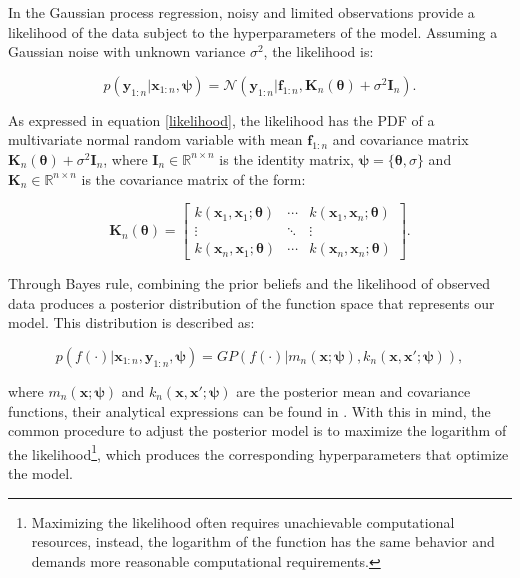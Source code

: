 \documentclass{article}
\begin{document}
In the Gaussian process regression, noisy and limited observations provide a likelihood of the data subject to the hyperparameters of the model. Assuming a Gaussian noise with unknown variance $\sigma^2$, the likelihood is\cite{Pandita2016}:

\begin{equation}
    p(\textbf{y}_{1:n}|\textbf{x}_{1:n}, \boldsymbol{\psi}) = \mathcal{N}(\textbf{y}_{1:n}|\textbf{f}_{1:n},\textbf{K}_n(\boldsymbol{\theta}) + \sigma^2\textbf{I}_n).
    \label{likelihood}
\end{equation}

As expressed in equation \ref{likelihood}, the likelihood has the PDF of a multivariate normal random variable with mean $\textbf{f}_{1:n}$ and covariance matrix $\textbf{K}_n(\boldsymbol{\theta}) + \sigma^2\textbf{I}_n$, where $\textbf{I}_n \in \mathbb{R}^{n\times n}$ is the identity matrix, $\boldsymbol{\psi} = \{ \boldsymbol{\theta}, \sigma \} $ and $\textbf{K}_n \in \mathbb{R}^{n\times n}$ is the covariance matrix of the form:

\begin{equation}
    \textbf{K}_n(\boldsymbol{\theta}) =
    \begin{bmatrix}
        k(\textbf{x}_1,\textbf{x}_1;\boldsymbol{\theta}) & \cdots & k(\textbf{x}_1,\textbf{x}_n;\boldsymbol{\theta}) \\
        \vdots & \ddots & \vdots\\
        k(\textbf{x}_n,\textbf{x}_1;\boldsymbol{\theta}) & \cdots & k(\textbf{x}_n,\textbf{x}_n;\boldsymbol{\theta})
    \end{bmatrix}.
\end{equation}

Through Bayes rule, combining the prior beliefs and the likelihood of observed data produces a posterior distribution of the function space that represents our model. This distribution is described as\cite{Pandita2016}:

\begin{equation}
    p(f(\cdot)|\textbf{x}_{1:n},\textbf{y}_{1:n},\boldsymbol{\psi}) = GP(f(\cdot)|m_n(\textbf{x};\boldsymbol{\psi}),k_n(\textbf{x},\textbf{x}';\boldsymbol{\psi})),
\end{equation}

where $m_n(\textbf{x};\boldsymbol{\psi})$ and $k_n(\textbf{x},\textbf{x}';\boldsymbol{\psi})$ are the posterior mean and covariance functions, their analytical expressions can be found in \cite{Pandita2016}. With this in mind, the common procedure to adjust the posterior model is to maximize the logarithm of the likelihood\footnote{Maximizing the likelihood often requires unachievable computational resources, instead, the logarithm of the function has the same behavior and demands more reasonable computational requirements.}, which produces the corresponding hyperparameters that optimize the model.
\end{document}

